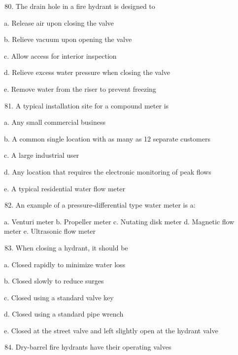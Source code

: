 \documentclass[10pt]{article}
\begin{document}
\begin{enumerate}
\begin{enumerate}
\begin{enumerate}
  \setcounter{enumi}{79}
  \item The drain hole in a fire hydrant is designed to
\end{enumerate}

a. Release air upon closing the valve

b. Relieve vacuum upon opening the valve

c. Allow access for interior inspection

d. Relieve excess water pressure when closing the valve

e. Remove water from the riser to prevent freezing

\begin{enumerate}
  \setcounter{enumi}{80}
  \item A typical installation site for a compound meter is
\end{enumerate}

a. Any small commercial business

b. A common single location with as many as 12 separate customers

c. A large industrial user

d. Any location that requires the electronic monitoring of peak flows

e. A typical residential water flow meter

\begin{enumerate}
  \setcounter{enumi}{81}
  \item An example of a pressure-differential type water meter is a:
\end{enumerate}

a. Venturi meter b. Propeller meter c. Nutating disk meter d. Magnetic flow meter e. Ultrasonic flow meter

\begin{enumerate}
  \setcounter{enumi}{82}
  \item When closing a hydrant, it should be
\end{enumerate}

a. Closed rapidly to minimize water loss

b. Closed slowly to reduce surges

c. Closed using a standard valve key

d. Closed using a standard pipe wrench

e. Closed at the street valve and left slightly open at the hydrant valve

\begin{enumerate}
  \setcounter{enumi}{83}
  \item Dry-barrel fire hydrants have their operating valves\\
\end{enumerate}


\end{enumerate}
\end{enumerate}
\end{document}

